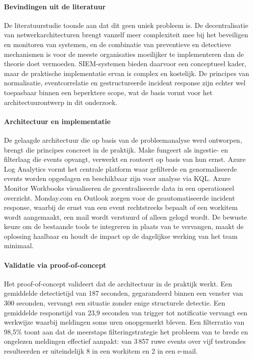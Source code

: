 \paragraph{Bevindingen uit de literatuur}
De literatuurstudie toonde aan dat dit geen uniek probleem is. De decentralisatie van netwerkarchitecturen brengt vanzelf meer complexiteit mee bij het beveiligen en monitoren van systemen, en de combinatie van preventieve en detectieve mechanismen is voor de meeste organisaties moeilijker te implementeren dan de theorie doet vermoeden. SIEM-systemen bieden daarvoor een conceptueel kader, maar de praktische implementatie ervan is complex en kostelijk. De principes van normalisatie, eventcorrelatie en gestructureerde incident response zijn echter wel toepasbaar binnen een beperktere scope, wat de basis vormt voor het architectuurontwerp in dit onderzoek.

\paragraph{Architectuur en implementatie}
De gelaagde architectuur die op basis van de probleemanalyse werd ontworpen, brengt die principes concreet in de praktijk. Make fungeert als ingestie- en filterlaag die events opvangt, verwerkt en routeert op basis van hun ernst. Azure Log Analytics vormt het centrale platform waar gefilterde en genormaliseerde events worden opgeslagen en beschikbaar zijn voor analyse via KQL. Azure Monitor Workbooks visualiseren de gecentraliseerde data in een operationeel overzicht. Monday.com en Outlook zorgen voor de geautomatiseerde incident response, waarbij de ernst van een event rechtstreeks bepaalt of een workitem wordt aangemaakt, een mail wordt verstuurd of alleen gelogd wordt. De bewuste keuze om de bestaande tools te integreren in plaats van te vervangen, maakt de oplossing haalbaar en houdt de impact op de dagelijkse werking van het team minimaal.

\paragraph{Validatie via proof-of-concept}
Het proof-of-concept valideert dat de architectuur in de praktijk werkt. Een gemiddelde detectietijd van 187 seconden, gegarandeerd binnen een venster van 300 seconden, vervangt een situatie zonder enige structurele detectie. Een gemiddelde responstijd van 23,9 seconden van trigger tot notificatie vervangt een werkwijze waarbij meldingen soms uren onopgemerkt bleven. Een filterratio van 98,5\% toont aan dat de meerstaps filteringstrategie het probleem van te brede en ongelezen meldingen effectief aanpakt: van 3\,857 ruwe events over vijf testrondes resulteerden er uiteindelijk 8 in een workitem en 2 in een e-mail.

